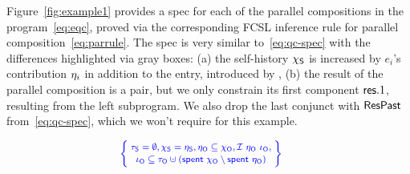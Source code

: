 Figure~\ref{fig:example1} provides a spec for each of the parallel
compositions in the program~\eqref{eq:eqc}, proved via the
corresponding FCSL inference rule for parallel
composition~\eqref{eq:parrule}.
%
The spec is very similar to~\eqref{eq:qc-spec} with the differences
highlighted via gray boxes: (a) the self-history $\chi_{\mathsf{S}}$ is increased
by $e_i$'s contribution $\eta_i$ in addition to the entry, introduced
by , (b) the result of the parallel composition is a
pair, but we only constrain its first component $\mathsf{res}.1$, resulting
from the left subprogram. We also drop the last conjunct with
$\mathsf{ResPast}$ from~\eqref{eq:qc-spec}, which we won't require for this
example.

\begin{figure}
\centering
\[
{\small{
\!\!\!\!\!\!\!\!
\begin{array}{c}
  \spec{\!\!
  \begin{array}{c}
    \tkns = \emptyset,
    \hists = \gists,
    \gisto \subseteq \histo, \Ic{\gisto}{\ikno}, \\[2pt]
    \ikno \subseteq \tkno \hunion (\Tomb~\histo \setminus \Tomb~\gisto)
  \end{array}
  \!\!}
\\\\[-5pt]
%
% 
  \begin{tabular}{c || c}

\end{tabular}
\end{array}}}\]
\end{figure}
